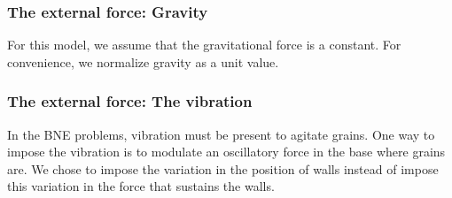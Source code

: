 \subsubsection{The external force: Gravity}
\label{subsubchap:Gravidade}
    For this model, we assume that the gravitational force is a constant. For convenience, we normalize gravity as a unit value.

\subsubsection{The external force: The vibration}
    In the BNE problems, vibration must be present to agitate grains. One way to impose the vibration is to modulate an oscillatory force in the base where grains are. We chose to impose the variation in the position of walls instead of impose this variation in the force that sustains the walls.

